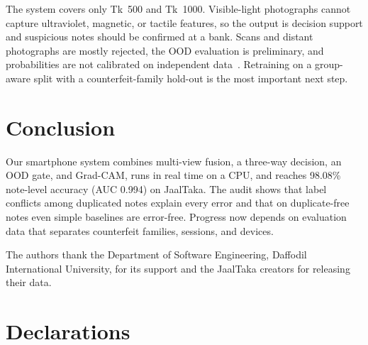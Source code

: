 \documentclass[pdflatex,sn-mathphys-num]{sn-jnl}
\begin{document}
The system covers only Tk~500 and Tk~1000. Visible-light photographs cannot capture
ultraviolet, magnetic, or tactile features, so the output is decision support and
suspicious notes should be confirmed at a bank. Scans and distant photographs are mostly
rejected, the OOD evaluation is preliminary, and probabilities are not calibrated on
independent data~\cite{guo2017calibration}. Retraining on a group-aware split with a
counterfeit-family hold-out is the most important next step.

\section{Conclusion}\label{sec:conclusion}

Our smartphone system combines multi-view fusion, a three-way decision, an OOD gate, and
Grad-CAM, runs in real time on a CPU, and reaches 98.08\% note-level accuracy (AUC
0.994) on JaalTaka. The audit shows that label conflicts among duplicated notes explain
every error and that on duplicate-free notes even simple baselines are error-free.
Progress now depends on evaluation data that separates counterfeit families, sessions,
and devices.

\backmatter

The authors thank the Department of Software Engineering, Daffodil International
University, for its support and the JaalTaka creators for releasing their data.

\section*{Declarations}
\end{document}
